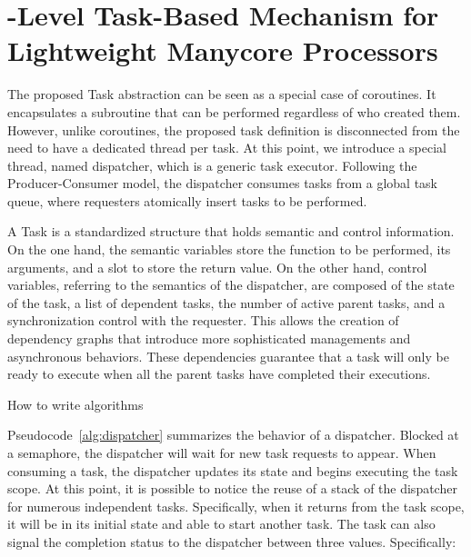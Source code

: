 \section{\os-Level Task-Based Mechanism for Lightweight Manycore Processors}
\label{sec:solution}

	The proposed Task abstraction can be seen as a special case of coroutines.
	It encapsulates a subroutine that can be performed regardless of who
	created them. However, unlike coroutines, the proposed task definition is
	disconnected from the need to have a dedicated thread per task. At this
	point, we introduce a special thread, named dispatcher, which is a generic
	task executor. Following the Producer-Consumer model, the dispatcher
	consumes tasks from a global task queue, where requesters atomically insert
	tasks to be performed.

	A Task is a standardized structure that holds semantic and control
	information. On the one hand, the semantic variables store the function to
	be performed, its arguments, and a slot to store the return value. On the
	other hand, control variables, referring to the semantics of the
	dispatcher, are composed of the state of the task, a list of dependent
	tasks, the number of active parent tasks, and a synchronization control
	with the requester. This allows the creation of dependency graphs that
	introduce more sophisticated managements and asynchronous behaviors. These
	dependencies guarantee that a task will only be ready to execute when all
	the parent tasks have completed their executions.

	\begin{algorithm}[b]
		\label{alg:dispatcher}
		\caption{How to write algorithms}
	\end{algorithm}

	Pseudocode~\ref{alg:dispatcher} summarizes the behavior of a dispatcher.
	Blocked at a semaphore, the dispatcher will wait for new task requests to
	appear. When consuming a task, the dispatcher updates its state and begins
	executing the task scope. At this point, it is possible to notice the reuse
	of a stack of the dispatcher for numerous independent tasks. Specifically,
	when it returns from the task scope, it will be in its initial state and
	able to start another task. The task can also signal the completion status
	to the dispatcher between three values. Specifically:

